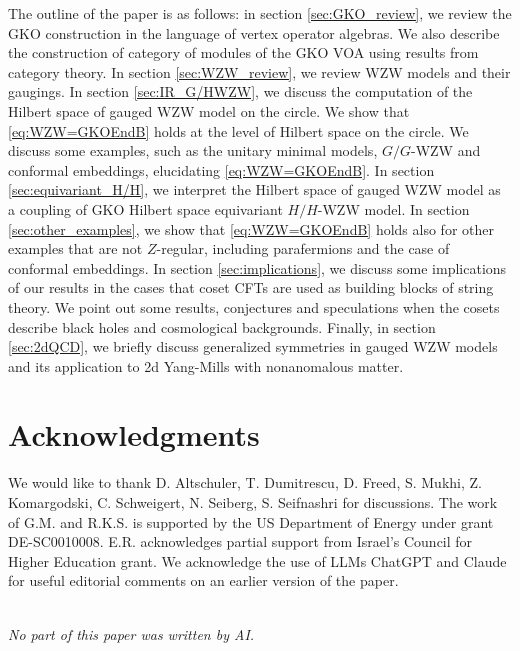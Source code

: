 \documentclass[a4paper,11pt]{article}
\newcommand{\tsf}[1]{\textsf{#1}}
\def\IR{{\mathbb{R}}}
\def\IZ{{\mathds{Z}}}
\def\rem{$\clubsuit$}
\newcommand{\cran}[1]{\marginpar{\raggedright \tiny \textcolor{OliveGreen}{\rem RKS: #1 \rem}}}    %
\begin{document}

The outline of the paper is as follows: in section \ref{sec:GKO_review}, we review the \tsf{GKO} construction in the language of vertex operator algebras. We also describe the construction of category of modules of the \tsf{GKO} \tsf{VOA} using results from category theory. In section \ref{sec:WZW_review}, we review \tsf{WZW} models and their gaugings. In section \ref{sec:IR_G/HWZW}, we discuss the computation of the Hilbert space of gauged \tsf{WZW} model on the circle. We show that \eqref{eq:WZW=GKOEndB} holds at the level of Hilbert space on the circle. We discuss some examples, such as the unitary minimal models, $G/G$-\tsf{WZW} and conformal embeddings, elucidating \eqref{eq:WZW=GKOEndB}. In section \ref{sec:equivariant_H/H}, we interpret the Hilbert space of gauged \tsf{WZW} model as a coupling of \tsf{GKO} Hilbert space equivariant $H/H$-\tsf{WZW} model.   In section \ref{sec:other_examples}, we show that \eqref{eq:WZW=GKOEndB} holds also for other examples that are not $Z$-regular, including parafermions and the case of conformal embeddings.   In section \ref{sec:implications}, we discuss some implications of our results in the cases that coset \tsf{CFT}s are used as building blocks of string theory. We point out some results, conjectures and speculations when the cosets describe black holes and cosmological backgrounds. Finally, in section \ref{sec:2dQCD}, we briefly discuss generalized symmetries in gauged \tsf{WZW} models and its application to 2d Yang-Mills with nonanomalous matter. 


\section*{Acknowledgments}
We would like to thank D. Altschuler, T. Dumitrescu, D. Freed, S. Mukhi, Z. Komargodski, C. Schweigert, N. Seiberg, S. Seifnashri   for discussions. 
The work of  G.M. and R.K.S. is supported by the US Department of Energy under grant DE-SC0010008.  E.R. acknowledges
partial support from Israel’s Council for Higher Education grant. We acknowledge the use of LLMs ChatGPT and Claude for useful editorial comments on an earlier version of the paper.
$\,$\\$\,$\\
\centerline{\emph{No part of this paper was written by AI.}}
\end{document}
